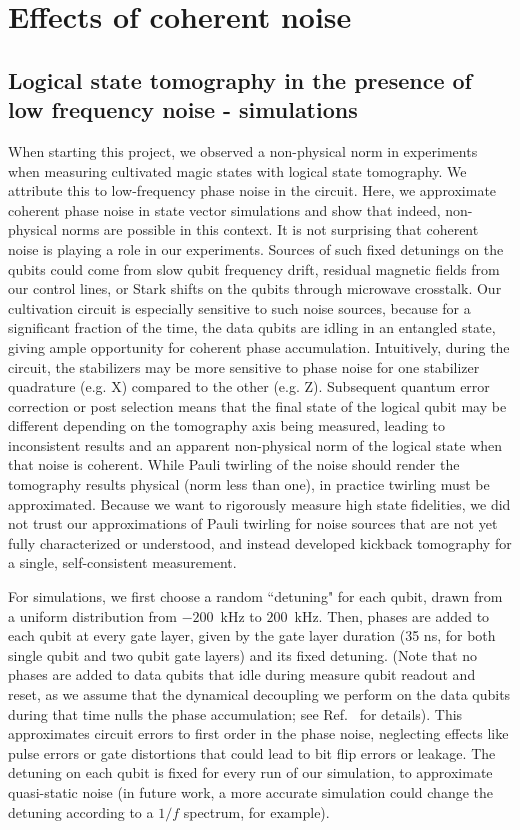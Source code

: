 \section{\label{sec:simulations-lfn}Effects of coherent noise}

\subsection{\label{sec:lfn_sims}Logical state tomography in the presence of low frequency noise - simulations}
When starting this project, we observed a non-physical norm in experiments when measuring cultivated magic states with logical state tomography. We attribute this to low-frequency phase noise in the circuit. Here, we approximate coherent phase noise in state vector simulations and show that indeed, non-physical norms are possible in this context. 
It is not surprising that coherent noise is playing a role in our experiments. Sources of such fixed detunings on the qubits could come from slow qubit frequency drift, residual magnetic fields from our control lines, or Stark shifts on the qubits through microwave crosstalk.
Our cultivation circuit is especially sensitive to such noise sources, because for a significant fraction of the time, the data qubits are idling in an entangled state, giving ample opportunity for coherent phase accumulation.
Intuitively, during the circuit, the stabilizers may be more sensitive to phase noise for one stabilizer quadrature (e.g. X) compared to the other (e.g. Z). Subsequent quantum error correction or post selection means that the final state of the logical qubit may be different depending on the tomography axis being measured, leading to inconsistent results and an apparent non-physical norm of the logical state when that noise is coherent. While Pauli twirling of the noise should render the tomography results physical (norm less than one), in practice twirling must be approximated. Because we want to rigorously measure high state fidelities, we did not trust our approximations of Pauli twirling for noise sources that are not yet fully characterized or understood, and instead developed kickback tomography for a single, self-consistent measurement.  

For simulations, we first choose a random ``detuning" for each qubit, drawn from a uniform distribution from $-200$~kHz to $200$~kHz. Then, phases are added to each qubit at every gate layer, given by the gate layer duration (35 ns, for both single qubit and two qubit gate layers) and its fixed detuning. (Note that no phases are added to data qubits that idle during measure qubit readout and reset, as we assume that the dynamical decoupling we perform on the data qubits during that time nulls the phase accumulation; see Ref.~\cite{acharya_quantum_2025} for details). This approximates circuit errors to first order in the phase noise, neglecting effects like pulse errors or gate distortions that could lead to bit flip errors or leakage. The detuning on each qubit is fixed for every run of our simulation, to approximate quasi-static noise (in future work, a more accurate simulation could change the detuning according to a $1/f$ spectrum, for example).

